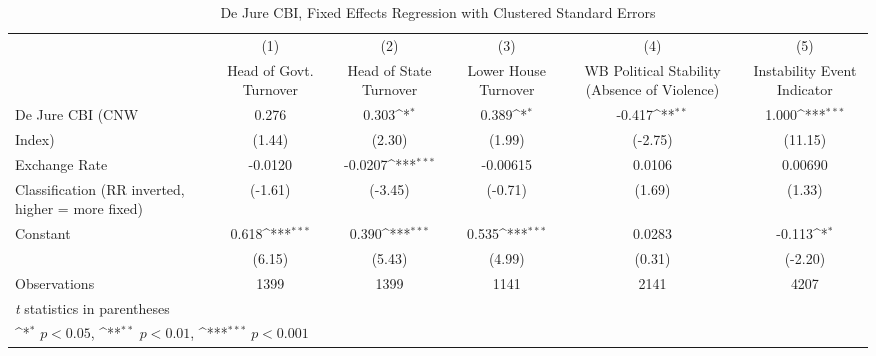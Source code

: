 \begin{table}[htbp]\centering
\def\sym#1{\ifmmode^{#1}\else\(^{#1}\)\fi}
\caption{De Jure CBI, Fixed Effects Regression with Clustered Standard Errors \label{multIndFEDJ}}
\begin{tabular}{l*{5}{c}}
\hline\hline
                    &\multicolumn{1}{c}{(1)}&\multicolumn{1}{c}{(2)}&\multicolumn{1}{c}{(3)}&\multicolumn{1}{c}{(4)}&\multicolumn{1}{c}{(5)}\\
                    &\multicolumn{1}{c}{Head of Govt. Turnover}&\multicolumn{1}{c}{Head of State Turnover}&\multicolumn{1}{c}{Lower House Turnover}&\multicolumn{1}{c}{WB Political Stability (Absence of Violence)}&\multicolumn{1}{c}{Instability Event Indicator}\\
\hline
De Jure CBI (CNW    &       0.276         &       0.303\sym{*}  &       0.389\sym{*}  &      -0.417\sym{**} &       1.000\sym{***}\\
Index)              &      (1.44)         &      (2.30)         &      (1.99)         &     (-2.75)         &     (11.15)         \\
[1em]
Exchange Rate       &     -0.0120         &     -0.0207\sym{***}&    -0.00615         &      0.0106         &     0.00690         \\
Classification (RR inverted, higher = more fixed)&     (-1.61)         &     (-3.45)         &     (-0.71)         &      (1.69)         &      (1.33)         \\
[1em]
Constant            &       0.618\sym{***}&       0.390\sym{***}&       0.535\sym{***}&      0.0283         &      -0.113\sym{*}  \\
                    &      (6.15)         &      (5.43)         &      (4.99)         &      (0.31)         &     (-2.20)         \\
\hline
Observations        &        1399         &        1399         &        1141         &        2141         &        4207         \\
\hline\hline
\multicolumn{6}{l}{\footnotesize \textit{t} statistics in parentheses}\\
\multicolumn{6}{l}{\footnotesize \sym{*} \(p<0.05\), \sym{**} \(p<0.01\), \sym{***} \(p<0.001\)}\\
\end{tabular}
\end{table}
